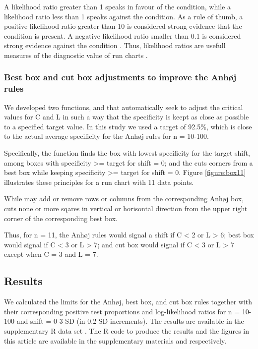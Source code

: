 A likelihood ratio greater than 1 speaks in favour of the condition,
while a likelihood ratio less than 1 speaks against the condition. As a
rule of thumb, a positive likelihood ratio greater than 10 is considered
strong evidence that the condition is present. A negative likelihood
ratio smaller than 0.1 is considered strong evidence against the
condition \citep{deeks2004}. Thus, likelihood ratios are usefull
measures of the diagnostic value of run charts
\citep{anhoej2015, anhoej2018}.

\hypertarget{best-box-and-cut-box-adjustments-to-improve-the-anhj-rules}{%
\subsubsection{Best box and cut box adjustments to improve the Anhøj
rules}\label{best-box-and-cut-box-adjustments-to-improve-the-anhj-rules}}

We developed two functions,  and  that
automatically seek to adjust the critical values for C and L in such a
way that the specificity is keept as close as possible to a specified
target value. In this study we used a target of 92.5\%, which is close
to the actual average specificity for the Anhøj rules for n = 10-100.

Specifically, the  function finds the box with lowest
specificity for the target shift, among boxes with specificity
\textgreater{}= target for shift = 0; and the  cuts
corners from a best box while keeping specificity \textgreater{}= target
for shift = 0. Figure \ref{figure:box11} illustrates these principles
for a run chart with 11 data points.

While  may add or remove rows or columns from the
corresponding Anhøj box,  cuts none or more sqares in
vertical or horisontal direction from the upper right corner of the
corresponding best box.

Thus, for n = 11, the Anhøj rules would signal a shift if C \textless{}
2 or L \textgreater{} 6; best box would signal if C \textless{} 3 or L
\textgreater{} 7; and cut box would signal if C \textless{} 3 or L
\textgreater{} 7 except when C = 3 and L = 7.

\hypertarget{results}{%
\subsection{Results}\label{results}}

We calculated the limits for the Anhøj, best box, and cut box rules
together with their corresponding positive test proportions and
log-likelihood ratios for n = 10-100 and shift = 0-3 SD (in 0.2 SD
increments). The results are available in the supplementary R data set
. The R code to produce the results and the figures
in this article are available in the supplementary materials
 and  respectively.

